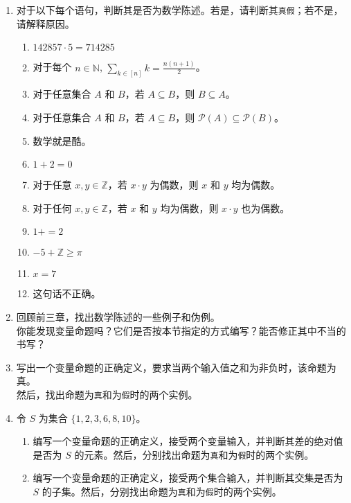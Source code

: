 \begin{enumerate}[label=(\arabic*)]
    \item 对于以下每个语句，判断其是否为数学陈述。若是，请判断其\verb|真|\verb|假|；若不是，请解释原因。
        \begin{enumerate}[label=(\alph*)]
            \item $142857 \cdot 5 = 714285$
            \item 对于每个 $n \in \mathbb{N}$, $\displaystyle{\sum_{k \in [n]}k=\frac{n(n+1)}{2}}$。
            \item 对于任意集合 $A$ 和 $B$，若 $A \subseteq B$，则 $B \subseteq A$。
            \item 对于任意集合 $A$ 和 $B$，若 $A \subseteq B$，则 $\mathcal{P}(A) \subseteq \mathcal{P}(B)$。
            \item 数学就是酷。
            \item $1 + 2 = 0$
            \item 对于任意 $x, y \in \mathbb{Z}$，若 $x \cdot y$ 为偶数，则 $x$ 和 $y$ 均为偶数。
            \item 对于任何 $x, y \in \mathbb{Z}$，若 $x$ 和 $y$ 均为偶数，则 $x \cdot y$ 也为偶数。
            \item $1+ = 2$
            \item $-5 + \mathbb{Z} \ge \pi$
            \item $x = 7$
            \item 这句话不正确。
        \end{enumerate}
    \item 回顾前三章，找出数学陈述的一些例子和伪例。\\
    你能发现变量命题吗？它们是否按本节指定的方式编写？能否修正其中不当的书写？
    \item 写出一个变量命题的正确定义，要求当两个输入值之和为非负时，该命题为真。\\
    然后，找出命题为\verb|真|和为\verb|假|时的两个实例。
    \item 令 $S$ 为集合 $\{1, 2, 3, 6, 8, 10\}$。
        \begin{enumerate}[label=(\alph*)]
            \item 编写一个变量命题的正确定义，接受两个变量输入，并判断其差的绝对值是否为 $S$ 的元素。然后，分别找出命题为\verb|真|和为\verb|假|时的两个实例。
            \item 编写一个变量命题的正确定义，接受两个集合输入，并判断其交集是否为 $S$ 的子集。然后，分别找出命题为\verb|真|和为\verb|假|时的两个实例。
        \end{enumerate}

\end{enumerate}
